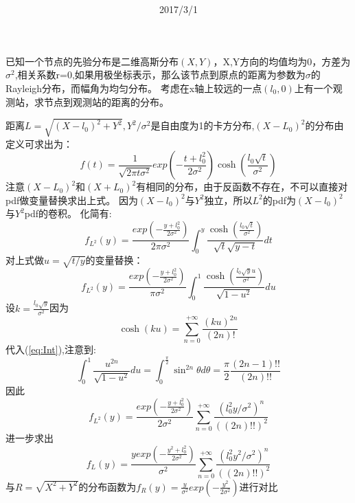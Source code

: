 \documentclass[12pt]{ctexart}
\theoremstyle{remark}
\begin{document}
\title{\textbf{}} 
\date{2017/3/1}
\author{}
\maketitle
\large
已知一个节点的先验分布是二维高斯分布$(X,Y)$，X,Y方向的均值均为0，方差为$\sigma^2$,相关系数r=0,如果用极坐标表示，那么该节点到原点的距离为参数为$\sigma$的Rayleigh分布，而幅角为均匀分布。
考虑在x轴上较远的一点$(l_0,0)$上有一个观测站，求节点到观测站的距离的分布。

距离$L=\sqrt{(X-l_0)^2+Y^2},Y^2/\sigma^2$是自由度为1的卡方分布,$(X-L_0)^2$的分布由定义可求出为：
\begin{equation}
f(t)=\frac{1}{\sqrt{2\pi t\sigma^2}}exp(-\frac{t+l_0^2}{2\sigma^2})\cosh(\frac{l_0\sqrt{t}}{\sigma^2})
\end{equation}
注意$(X-L_0)^2$和$(X+L_0)^2$有相同的分布，由于反函数不存在，不可以直接对pdf做变量替换求出上式。
因为$(X-l_0)^2$与$Y^2$独立，所以$L^2$的pdf为$(X-l_0)^2$与$Y^2$pdf的卷积。
化简有:
\begin{equation}
f_{L^2}(y)=\frac{exp(-\frac{y+l_0^2}{2\sigma^2})}{2\pi\sigma^2}\int_0^y \frac{\cosh(\frac{l_0\sqrt{t}}{\sigma^2})}{\sqrt{t}\sqrt{y-t}}dt
\end{equation}
对上式做$u=\sqrt{t/y}$的变量替换：
\begin{equation}\label{eq:Int}
f_{L^2}(y)=\frac{exp(-\frac{y+l_0^2}{2\sigma^2})}{\pi\sigma^2}\int_0^1 \frac{\cosh(\frac{l_0\sqrt{y}u}{\sigma^2})}{\sqrt{1-u^2}}du
\end{equation}
设$k=\frac{l_0\sqrt{y}}{\sigma^2}$因为
\begin{equation}
\cosh(ku)=\sum_{n=0}^{+\infty} \frac{(ku)^{2n}}{(2n)!}
\end{equation}
代入(\ref{eq:Int}),注意到:
\begin{equation}
\int_0^1 \frac{u^{2n}}{\sqrt{1-u^2}}du=\int_0^{\frac{\pi}{2}} \sin^{2n} \theta d\theta=\frac{\pi}{2}\frac{(2n-1)!!}{(2n)!!} 
\end{equation}
因此
\begin{equation}
f_{L^2}(y)=\frac{exp(-\frac{y+l_0^2}{2\sigma^2})}{2\sigma^2}\sum_{n=0}^{+\infty}\frac{(l_0^2 y/\sigma^2)^n}{((2n)!!)^2}
\end{equation}
进一步求出
\begin{equation}
f_{L}(y)=\frac{yexp(-\frac{y^2+l_0^2}{2\sigma^2})}{\sigma^2}\sum_{n=0}^{+\infty}\frac{(l_0^2 y^2/\sigma^2)^n}{((2n)!!)^2}
\end{equation}
与$R=\sqrt{X^2+Y^2}$的分布函数为$f_{R}(y)=\frac{y}{\sigma^2}exp(-\frac{y^2}{2\sigma^2})$进行对比
\end{document}
